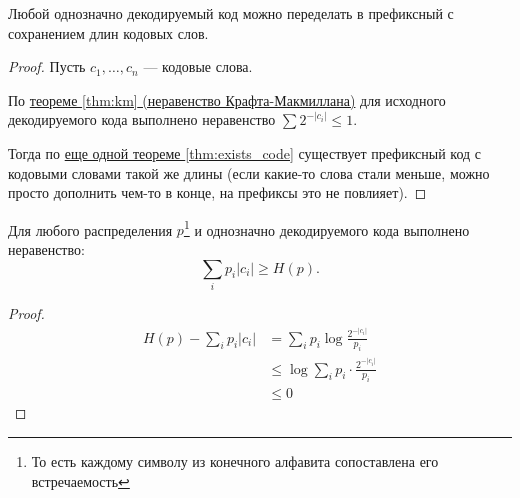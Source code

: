 \begin{thm}
    Любой однозначно декодируемый код можно переделать в префиксный с сохранением длин кодовых слов.
\end{thm}
\begin{proof}
	Пусть $  c_1, \ldots , c_n$ --- кодовые слова.

	По \hyperref[thm:km]{теореме \ref{thm:km} (неравенство Крафта-Макмиллана)} для исходного декодируемого кода выполнено неравенство
	$ \sum 2^{-\lvert c_i \rvert } \le 1$.

	Тогда по \hyperref[thm:exists_code]{еще одной теореме \ref{thm:exists_code}} существует префиксный код с кодовыми словами такой же длины (если какие-то слова стали меньше, можно просто дополнить чем-то в конце, на префиксы это не повлияет).

\end{proof}



\begin{thm}[Шеннон]
Для любого распределения $ p$\footnote{То есть каждому символу из конечного алфавита сопоставлена его встречаемость} и однозначно декодируемого кода выполнено неравенство:
   \[
	   \sum_{i} p_i \lvert c_i \rvert \ge  H(p) 
   .\] 
\end{thm}
\begin{proof}
	\begin{align*}
		H(p) - \sum_{i}^{} p_i \lvert c_i \rvert &= \sum_{i} p_i \log \frac{2^{-\lvert c_i \rvert }}{p_i} \\
												 & \le  \log \sum_i p_i \cdot \frac{2^{-\lvert c_i \rvert }}{p_i} \tag{Неравенство Йенсена}\\ 
												 & \le  0 \tag{Неравенство Крафта-Макмиллана}
	\end{align*}
\end{proof}


